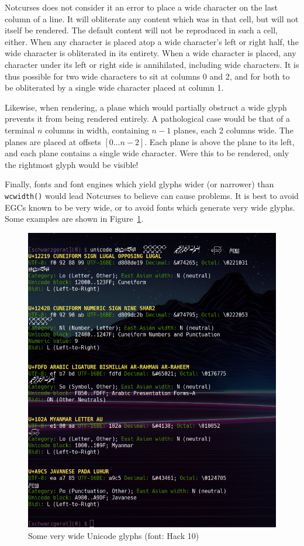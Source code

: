 Notcurses does not consider it an error to place a wide character on the last
column of a line. It will obliterate any content which was in that cell, but
will not itself be rendered. The default content will not be reproduced in such
a cell, either. When any character is placed atop a wide character's left or
right half, the wide character is obliterated in its entirety. When a wide
character is placed, any character under its left or right side is annihilated,
including wide characters. It is thus possible for two wide characters to sit
at columns 0 and 2, and for both to be obliterated by a single wide character
placed at column 1.

Likewise, when rendering, a plane which would partially obstruct a wide glyph
prevents it from being rendered entirely. A pathological case would be that of
a terminal $n$ columns in width, containing $n-1$ planes, each 2 columns wide.
The planes are placed at offsets $[0\ldots n-2]$. Each plane is above the plane to
its left, and each plane contains a single wide character. Were this to be
rendered, only the rightmost glyph would be visible!

Finally, fonts and font engines which yield glyphs wider (or narrower) than
\texttt{wcwidth()} would lead Notcurses to believe can cause problems. It is
best to avoid EGCs known to be very wide, or to avoid fonts which generate very
wide glyphs. Some examples are shown in Figure~\ref{fig:wideglyphs}.

\begin{figure}[!htb]
\centering
\includegraphics[width=1\linewidth]{media/wide-unicode.png}
\caption[Some very wide Unicode glyphs]{Some very wide Unicode glyphs (font: Hack 10)}
\label{fig:wideglyphs}
\end{figure}

